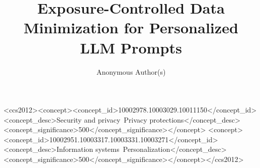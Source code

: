 \documentclass[sigconf,anonymous,review,balance=false]{acmart}
\begin{document}
\raggedbottom
\title{Exposure-Controlled Data Minimization for Personalized LLM Prompts}
\author{Anonymous Author(s)}

\begin{CCSXML}
<ccs2012><concept><concept_id>10002978.10003029.10011150</concept_id>
<concept_desc>Security and privacy~Privacy protections</concept_desc>
<concept_significance>500</concept_significance></concept>
<concept><concept_id>10002951.10003317.10003331.10003271</concept_id>
<concept_desc>Information systems~Personalization</concept_desc>
<concept_significance>500</concept_significance></concept></ccs2012>
\end{CCSXML}
\maketitle











\end{document}
